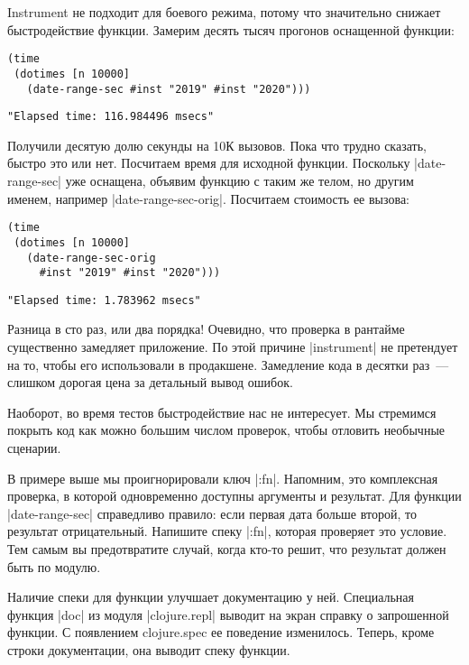 Instrument не подходит для боевого режима, потому что значительно снижает
быстродействие функции. Замерим десять тысяч прогонов оснащенной функции:

\begin{verbatim}
(time
 (dotimes [n 10000]
   (date-range-sec #inst "2019" #inst "2020")))
\end{verbatim}

\begin{verbatim}
"Elapsed time: 116.984496 msecs"
\end{verbatim}

Получили десятую долю секунды на 10К вызовов. Пока что трудно сказать, быстро
это или нет. Посчитаем время для исходной функции. Поскольку \spverb|date-range-sec|
уже оснащена, объявим функцию с таким же телом, но другим именем, например
\spverb|date-range-sec-orig|. Посчитаем стоимость ее вызова:

\begin{verbatim}
(time
 (dotimes [n 10000]
   (date-range-sec-orig
     #inst "2019" #inst "2020")))
\end{verbatim}

\begin{verbatim}
"Elapsed time: 1.783962 msecs"
\end{verbatim}

Разница в сто раз, или два порядка! Очевидно, что проверка в рантайме
существенно замедляет приложение. По этой причине \spverb|instrument| не претендует на
то, чтобы его использовали в продакшене. Замедление кода в десятки раз~--- слишком
дорогая цена за детальный вывод ошибок.

Наоборот, во время тестов быстродействие нас не интересует. Мы стремимся покрыть
код как можно большим числом проверок, чтобы отловить необычные сценарии.

В примере выше мы проигнорировали ключ \spverb|:fn|. Напомним, это комплексная
проверка, в которой одновременно доступны аргументы и результат. Для функции
\spverb|date-range-sec| справедливо правило: если первая дата больше второй, то
результат отрицательный. Напишите спеку \spverb|:fn|, которая проверяет это
условие. Тем самым вы предотвратите случай, когда кто-то решит, что результат
должен быть по модулю.

Наличие спеки для функции улучшает документацию у ней. Специальная функция \spverb|doc|
из модуля \spverb|clojure.repl| выводит на экран справку о запрошенной функции. С
появлением clojure.spec ее поведение изменилось. Теперь, кроме строки
документации, она выводит спеку функции.

